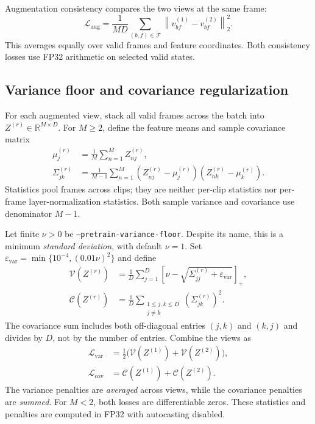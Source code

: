 \documentclass[11pt,a4paper]{article}
\newcommand{\R}{\mathbb{R}}
\newcommand{\eps}{\varepsilon}
\newcommand{\norm}[1]{\left\lVert #1\right\rVert}
\newcommand{\pos}[1]{\left[#1\right]_{+}}
\numberwithin{equation}{section}
\begin{document}
Augmentation consistency compares the two views at the same frame:
\begin{equation}
\mathcal L_{\mathrm{aug}}
=\frac{1}{MD}\sum_{(b,f)\in\mathcal F}
  \norm{v_{bf}^{(1)}-v_{bf}^{(2)}}_2^2.
\label{eq:pretrain-view}
\end{equation}
This averages equally over valid frames and feature coordinates.
Both consistency losses use FP32 arithmetic on selected valid states.

\subsection{Variance floor and covariance regularization}

For each augmented view, stack all valid frames across the batch into
$Z^{(r)}\in\R^{M\times D}$. For $M\geq2$, define the feature means
and sample covariance matrix
\begin{align}
\mu_j^{(r)}&=\frac1M\sum_{n=1}^{M}Z_{nj}^{(r)},\\
\Sigma_{jk}^{(r)}&=\frac1{M-1}\sum_{n=1}^{M}
 (Z_{nj}^{(r)}-\mu_j^{(r)})(Z_{nk}^{(r)}-\mu_k^{(r)}).
\label{eq:pretrain-statistics}
\end{align}
Statistics pool frames across clips; they are neither per-clip
statistics nor per-frame layer-normalization statistics. Both sample
variance and covariance use denominator $M-1$.

Let finite $\nu>0$ be \texttt{--pretrain-variance-floor}. Despite its name,
this is a minimum \emph{standard deviation}, with default $\nu=1$.
Set $\eps_{\mathrm{var}}=\min\{10^{-4},(0.01\nu)^2\}$ and define
\begin{align}
\mathcal V(Z^{(r)})
 &=\frac1D\sum_{j=1}^{D}
   \pos{\nu-\sqrt{\Sigma_{jj}^{(r)}+\eps_{\mathrm{var}}}},\\
\mathcal C(Z^{(r)})
 &=\frac1D\sum_{\substack{1\leq j,k\leq D\\j\ne k}}
   (\Sigma_{jk}^{(r)})^2.
\end{align}
The covariance sum includes both off-diagonal entries $(j,k)$ and
$(k,j)$ and divides by $D$, not by the number of entries. Combine the
views as
\begin{align}
\mathcal L_{\mathrm{var}}
 &=\tfrac12\bigl(\mathcal V(Z^{(1)})+\mathcal V(Z^{(2)})\bigr),\\
\mathcal L_{\mathrm{cov}}
 &=\mathcal C(Z^{(1)})+\mathcal C(Z^{(2)}).
\label{eq:pretrain-diversity}
\end{align}
The variance penalties are \emph{averaged} across views, while the
covariance penalties are \emph{summed}. For $M<2$, both losses are
differentiable zeros. These statistics and penalties are computed in
FP32 with autocasting disabled.
\end{document}
